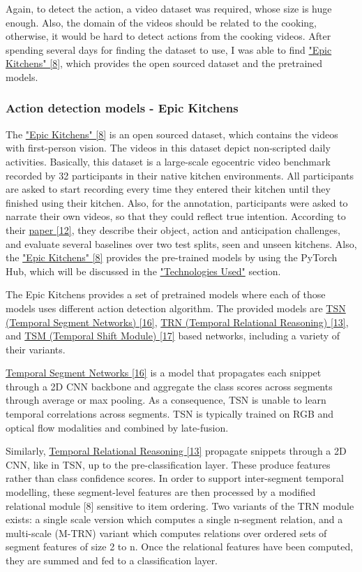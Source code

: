 \documentclass{article}
\begin{document}
Again, to detect the action, a video dataset was required, whose size is huge enough. Also, the domain of the videos should be related to the cooking, otherwise, it would be hard to detect actions from the cooking videos. After spending several days for finding the dataset to use, I was able to find \hyperlink{ref8}{"Epic Kitchens" [8]}, which provides the open sourced dataset and the pretrained models.

\subsubsection{Action detection models - Epic Kitchens}

The \hyperlink{ref8}{"Epic Kitchens" [8]} is an open sourced dataset, which contains the videos with first-person vision. The videos in this dataset depict non-scripted daily activities. Basically, this dataset is  a large-scale egocentric video benchmark recorded by 32 participants in their native kitchen environments. All participants are asked to start recording every time they entered their kitchen until they finished using their kitchen. Also, for the annotation, participants were asked to narrate their own videos, so that they could reflect true intention. According to their \hyperlink{ref12}{paper [12]}, they describe their object, action and anticipation challenges, and evaluate several baselines over two test splits, seen and unseen kitchens. Also, the \hyperlink{ref8}{"Epic Kitchens" [8]} provides the pre-trained models by using the PyTorch Hub, which will be discussed in the \hyperlink{actionDetection_used}{"Technologies Used"} section.

The Epic Kitchens provides a set of pretrained models where each of those models uses different action detection algorithm. The provided models are \hyperlink{ref16}{TSN (Temporal Segment Networks) [16]}, \hyperlink{ref13}{TRN (Temporal Relational Reasoning) [13]}, and \hyperlink{ref17}{TSM (Temporal Shift Module) [17]} based networks, including a variety of their variants.

\hyperlink{ref16}{Temporal Segment Networks [16]} is a model that propagates each snippet through a 2D CNN backbone and aggregate the class scores across segments through average or max pooling. As a consequence, TSN is unable to learn temporal correlations across segments. TSN is typically trained on RGB and optical flow modalities and combined by late-fusion.

Similarly, \hyperlink{ref13}{Temporal Relational Reasoning [13]} propagate snippets through a 2D CNN, like in TSN, up to the pre-classification layer. These produce features rather than class confidence scores. In order to support inter-segment temporal modelling, these segment-level features are then processed by a modified relational module [8] sensitive to item ordering. Two variants of the TRN module exists: a single scale version which computes a single n-segment relation, and a multi-scale (M-TRN) variant which computes relations over ordered sets of segment features of size 2 to n. Once the relational features have been computed, they are summed and fed to a classification layer.
\end{document}
